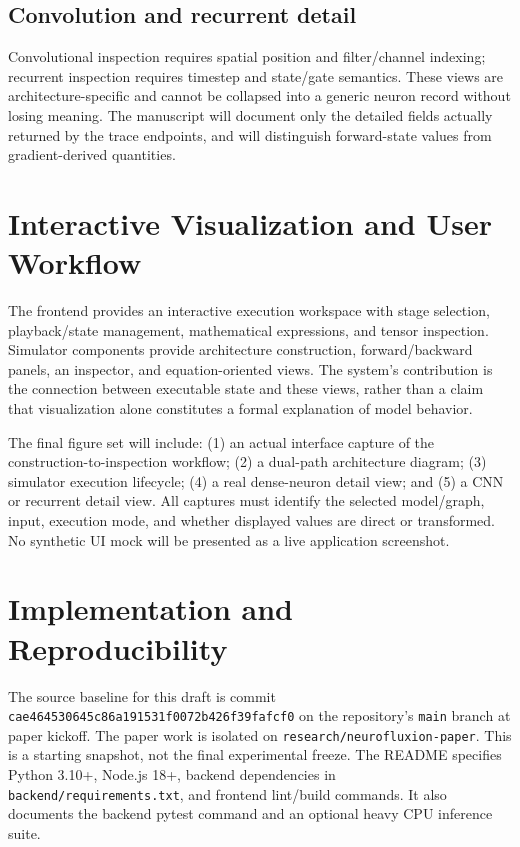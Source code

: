 \documentclass[conference]{IEEEtran}
\begin{document}
\subsection{Convolution and recurrent detail}
Convolutional inspection requires spatial position and filter/channel indexing; recurrent inspection requires timestep and state/gate semantics. These views are architecture-specific and cannot be collapsed into a generic neuron record without losing meaning. The manuscript will document only the detailed fields actually returned by the trace endpoints, and will distinguish forward-state values from gradient-derived quantities.

\section{Interactive Visualization and User Workflow}
The frontend provides an interactive execution workspace with stage selection, playback/state management, mathematical expressions, and tensor inspection. Simulator components provide architecture construction, forward/backward panels, an inspector, and equation-oriented views. The system's contribution is the connection between executable state and these views, rather than a claim that visualization alone constitutes a formal explanation of model behavior.

The final figure set will include: (1) an actual interface capture of the construction-to-inspection workflow; (2) a dual-path architecture diagram; (3) simulator execution lifecycle; (4) a real dense-neuron detail view; and (5) a CNN or recurrent detail view. All captures must identify the selected model/graph, input, execution mode, and whether displayed values are direct or transformed. No synthetic UI mock will be presented as a live application screenshot.

\section{Implementation and Reproducibility}
The source baseline for this draft is commit \texttt{cae464530645c86a191531f0072b426f39fafcf0} on the repository's \texttt{main} branch at paper kickoff. The paper work is isolated on \texttt{research/neurofluxion-paper}. This is a starting snapshot, not the final experimental freeze. The README specifies Python 3.10+, Node.js 18+, backend dependencies in \texttt{backend/requirements.txt}, and frontend lint/build commands. It also documents the backend pytest command and an optional heavy CPU inference suite.
\end{document}
